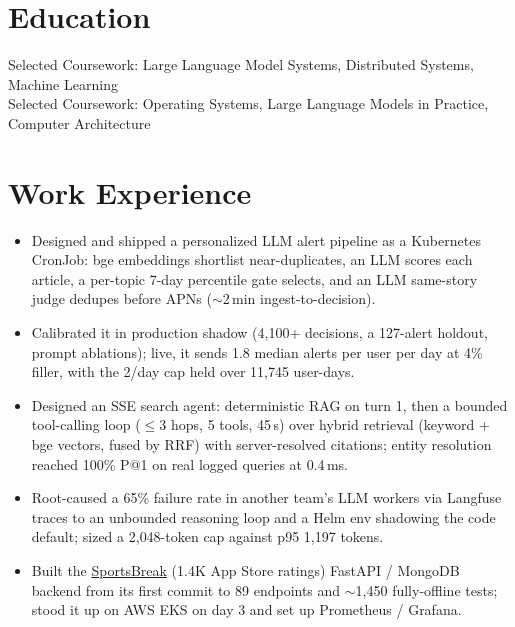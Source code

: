 \documentclass[11pt, letterpaper]{article}
\begin{document}

\section{Education}
Selected Coursework: Large Language Model Systems, Distributed Systems, Machine Learning\\[1pt]
Selected Coursework: Operating Systems, Large Language Models in Practice, Computer Architecture

\section{Work Experience}
\begin{itemize}
  \item Designed and shipped a personalized LLM alert pipeline as a Kubernetes CronJob: bge embeddings shortlist near-duplicates, an LLM scores each article, a per-topic 7-day percentile gate selects, and an LLM same-story judge dedupes before APNs ($\sim$2\,min ingest-to-decision).
  \item Calibrated it in production shadow (4{,}100+ decisions, a 127-alert holdout, prompt ablations); live, it sends 1.8 median alerts per user per day at 4\% filler, with the 2/day cap held over 11{,}745 user-days.
  \item Designed an SSE search agent: deterministic RAG on turn 1, then a bounded tool-calling loop ($\le$3 hops, 5 tools, 45\,s) over hybrid retrieval (keyword + bge vectors, fused by RRF) with server-resolved citations; entity resolution reached 100\% P@1 on real logged queries at 0.4\,ms.
  \item Root-caused a 65\% failure rate in another team's LLM workers via Langfuse traces to an unbounded reasoning loop and a Helm env shadowing the code default; sized a 2{,}048-token cap against p95 1{,}197 tokens.
  \item Built the \href{https://apps.apple.com/app/id6762649287}{SportsBreak} (1.4K App Store ratings) FastAPI / MongoDB backend from its first commit to 89 endpoints and $\sim$1{,}450 fully-offline tests; stood it up on AWS EKS on day 3 and set up Prometheus / Grafana.
\end{itemize}
\end{document}
